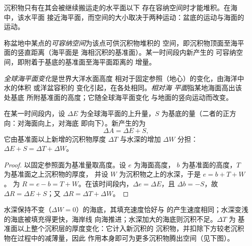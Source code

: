 沉积物只有在其会被继续搬运走的水平面以下
存在容纳空间时才能堆积。在海中，该水平面
接近海平面，而空间的大小取决于两种运动：盆底的运动与海面的运动。

\begin{definition}[可容纳空间]\label{def:b1:diagenesis-basins:accommodation}
称盆地中某点的\emph{可容纳空间}为该点可供沉积物堆积的
空间，即沉积物顶面至海平面的竖直距离（海平面是
海相沉积的基准面）。某一时间段内新产生的
可容纳空间，即附着于基底的基准面至海平面距离的
增量。
\end{definition}

\begin{definition}\label{def:b1:diagenesis-basins:eustasy}
\emph{全球海平面变化}是世界大洋水面高度
相对于固定参照（地心）的变化，由海洋中水的体积
或洋盆容积的
变化引起，在各处相同。\emph{相对海
平面}指某地海面高出该处基底
所附基准面的高度；它随全球海平面变化
与地面的竖向运动而改变。
\end{definition}

\begin{proposition}[可容纳空间的收支]\label{prop:b1:diagenesis-basins:budget}
在某一时间段内，设 $\Delta E$ 为全球海平面的上升量，$S$
为基底的量（二者的正方向：对海面向上，对海底
即向下）。新产生的为
\[
  \Delta A = \Delta E + S ,
\]
它由基准面以上新增的沉积物厚度 
$\Delta T$ 与水深的增加 $\Delta W$ 分担：
$\Delta E + S = \Delta T + \Delta W$。
\end{proposition}

\begin{proof}
以固定参照面为基准量取高度。设 $e$ 为海面高度，
$b$ 为基准面的高度，$T$ 为基准面之上沉积物的厚度，
并设 $W$ 为沉积物之上的水深，于是 $e = b + T + W$。
为 $R = e - b = T + W$。在该时间段内，$\Delta e =
\Delta E$，且 $\Delta b = -S$，故 $\Delta R = \Delta E + S$；又 $\Delta R =
\Delta T + \Delta W$。
\end{proof}

水深保持不变（$\Delta W = 0$）的海底，其填充速度恰好与
的产生速度相同；水深变浅的海底被填充得更快，海岸线
向海推进；水深加大的海底则沉积不足。$\Delta T$ 为
基准面以上整个沉积层的厚度变化：它计入新沉积的
沉积物，并扣除下方较老沉积物在过程中的减薄量，因此
作用本身即可为更多沉积物腾出空间（见下图）。

